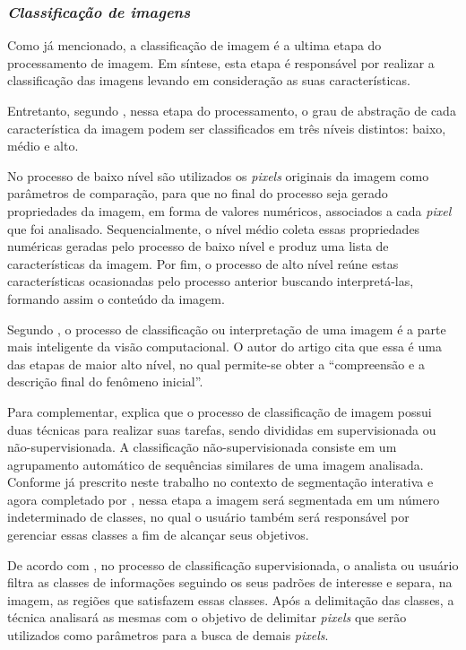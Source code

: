 \subsubsection{\textit{Classificação de imagens}}

Como já mencionado, a classificação de imagem é a ultima etapa do processamento de imagem. Em síntese, esta etapa é responsável por realizar a classificação das imagens levando em consideração as suas características.

Entretanto, segundo , nessa etapa do processamento, o grau de abstração de cada característica da imagem podem ser classificados em três níveis distintos: baixo, médio e alto.

No processo de baixo nível são utilizados os \textit{pixels} originais da imagem como parâmetros de comparação, para que no final do processo seja gerado propriedades da imagem, em forma de valores numéricos, associados a cada \textit{pixel} que foi analisado. Sequencialmente, o nível médio coleta essas propriedades numéricas geradas pelo processo de baixo nível e produz uma lista de características da imagem. Por fim, o processo de alto nível reúne estas características ocasionadas pelo processo anterior buscando interpretá-las, formando assim o conteúdo da imagem.

Segundo , o processo de classificação ou interpretação de uma imagem é a parte mais inteligente da visão computacional. O autor do artigo cita que essa é uma das etapas de maior alto nível, no qual permite-se obter a “compreensão e a descrição final do fenômeno inicial”.

Para complementar,  explica que o processo de classificação de imagem possui duas técnicas para realizar suas tarefas, sendo divididas em supervisionada ou não-supervisionada. A classificação não-supervisionada consiste em um agrupamento automático de sequências similares de uma imagem analisada. Conforme já prescrito neste trabalho no contexto de segmentação interativa e agora completado por , nessa etapa a imagem será segmentada em um número indeterminado de classes, no qual o usuário também será responsável por gerenciar essas classes a fim de alcançar seus objetivos.

De acordo com , no processo de classificação supervisionada, o analista ou usuário filtra as classes de informações seguindo os seus padrões de interesse e separa, na imagem, as regiões que satisfazem essas classes. Após a delimitação das classes, a técnica analisará as mesmas com o objetivo de delimitar \textit{pixels} que serão utilizados como parâmetros para a busca de demais \textit{pixels}.

